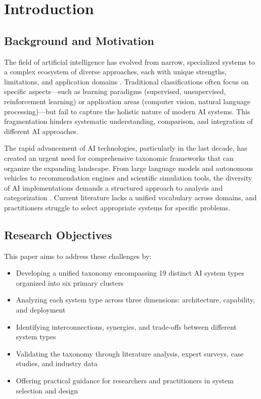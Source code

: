 \documentclass[11pt, a4paper]{article}
\begin{document}
\section{Introduction}

\subsection{Background and Motivation}
The field of artificial intelligence has evolved from narrow, specialized systems to a complex ecosystem of diverse approaches, each with unique strengths, limitations, and application domains \cite{arrieta2020explainable, jordan2015machine, russell2021artificial}. Traditional classifications often focus on specific aspects---such as learning paradigms (supervised, unsupervised, reinforcement learning) \cite{bengio2013representation, lecun2015deep} or application areas (computer vision, natural language processing)---but fail to capture the holistic nature of modern AI systems. This fragmentation hinders systematic understanding, comparison, and integration of different AI approaches.

The rapid advancement of AI technologies, particularly in the last decade, has created an urgent need for comprehensive taxonomic frameworks that can organize the expanding landscape. From large language models \cite{bommasani2021opportunities, brown2020language} and autonomous vehicles to recommendation engines and scientific simulation tools, the diversity of AI implementations demands a structured approach to analysis and categorization \cite{goodfellow2016deep}. Current literature lacks a unified vocabulary across domains, and practitioners struggle to select appropriate systems for specific problems.

\subsection{Research Objectives}
This paper aims to address these challenges by:
\begin{itemize}
    \item Developing a unified taxonomy encompassing 19 distinct AI system types organized into six primary clusters
    \item Analyzing each system type across three dimensions: architecture, capability, and deployment
    \item Identifying interconnections, synergies, and trade-offs between different system types
    \item Validating the taxonomy through literature analysis, expert surveys, case studies, and industry data
    \item Offering practical guidance for researchers and practitioners in system selection and design
\end{itemize}
\end{document}
